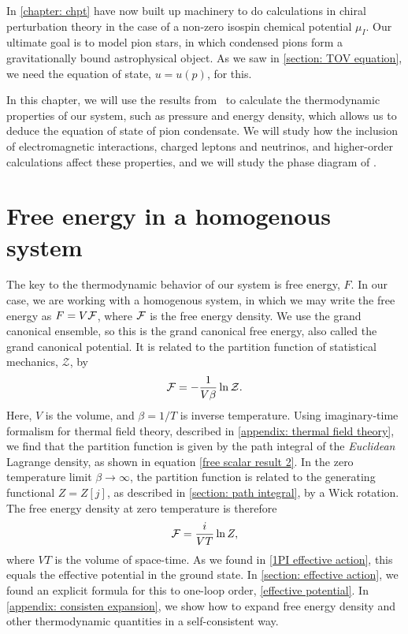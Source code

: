 In \autoref{chapter: chpt} have now built up machinery to do calculations in chiral perturbation theory in the case of a non-zero isospin chemical potential $\mu_I$.
Our ultimate goal is to model pion stars, in which condensed pions form a gravitationally bound astrophysical object.
As we saw in \autoref{section: TOV equation}, we need the equation of state, $u = u(p)$, for this.

In this chapter, we will use the results from \chpt\ to calculate the thermodynamic properties of our system, such as pressure and energy density, which allows us to deduce the equation of state of pion condensate.
We will study how the inclusion of electromagnetic interactions, charged leptons and neutrinos, and higher-order calculations affect these properties, and we will study the phase diagram of \chpt.

\section{Free energy in a homogenous system}

The key to the thermodynamic behavior of our system is free energy, $F$.
In our case, we are working with a homogenous system, in which we may write the free energy as $F = V\mathcal{F}$, where $\mathcal{F}$ is the free energy density.
We use the grand canonical ensemble, so this is the grand canonical free energy, also called the grand canonical potential.
It is related to the partition function of statistical mechanics, $\mathcal{Z}$, by
%
\begin{equation}
    \mathcal{F} = - \frac{1}{V \beta} \ln \mathcal{Z}.
\end{equation}
%
Here, $V$ is the volume, and $\beta = 1/T$ is inverse temperature.
Using imaginary-time formalism for thermal field theory, described in \autoref{appendix: thermal field theory}, we find that the partition function is given by the path integral of the \emph{Euclidean} Lagrange density, as shown in equation \autoref{free scalar result 2}.
In the zero temperature limit  $\beta \rightarrow \infty$, the partition function is related to the generating functional $Z = Z[j]$, as described in \autoref{section: path integral}, by a Wick rotation.
The free energy density at zero temperature is therefore
%
\begin{equation}
    \mathcal{F} = \frac{i}{VT} \ln Z,
\end{equation}
%
where $VT$ is the volume of space-time.
As we found in \autoref{1PI effective action}, this equals the effective potential in the ground state.
In \autoref{section: effective action}, we found an explicit formula for this to one-loop order, \autoref{effective potential}.
In \autoref{appendix: consisten expansion}, we show how to expand free energy density and other thermodynamic quantities in a self-consistent way.

